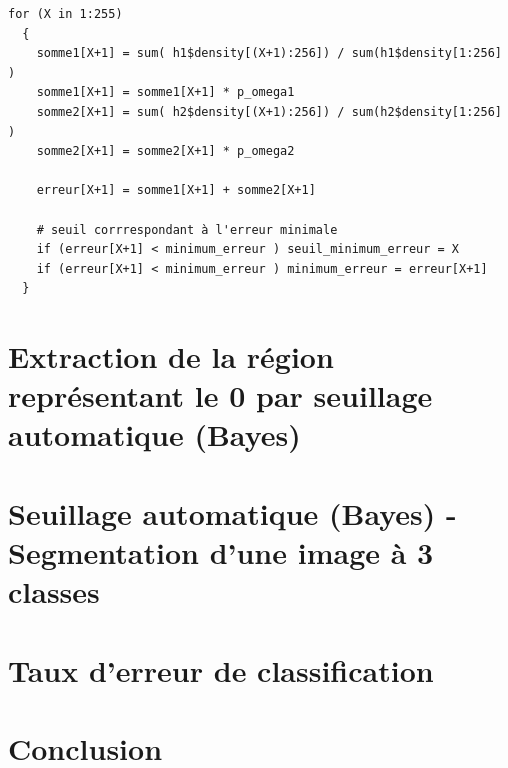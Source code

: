 \documentclass[a4paper,11pt]{article}
\begin{document}
  \begin{lstlisting}[caption=Macros de calcule de probabilité à priori des classe $N_{w_1}$ et $N_{w_2}$]
  for (X in 1:255) 
  { 
    somme1[X+1] = sum( h1$density[(X+1):256]) / sum(h1$density[1:256] )
    somme1[X+1] = somme1[X+1] * p_omega1  
    somme2[X+1] = sum( h2$density[(X+1):256]) / sum(h2$density[1:256] )
    somme2[X+1] = somme2[X+1] * p_omega2

    erreur[X+1] = somme1[X+1] + somme2[X+1]
    
    # seuil corrrespondant à l'erreur minimale
    if (erreur[X+1] < minimum_erreur ) seuil_minimum_erreur = X
    if (erreur[X+1] < minimum_erreur ) minimum_erreur = erreur[X+1]
  }
  \end{lstlisting}
  
  
  \section{Extraction de la région représentant le 0 par seuillage automatique (Bayes)}
  
  \section{Seuillage automatique (Bayes) - Segmentation d’une image à 3 classes}
  
  \section{Taux d’erreur de classification}
  
  \section*{Conclusion}
 
    
\end{document}
